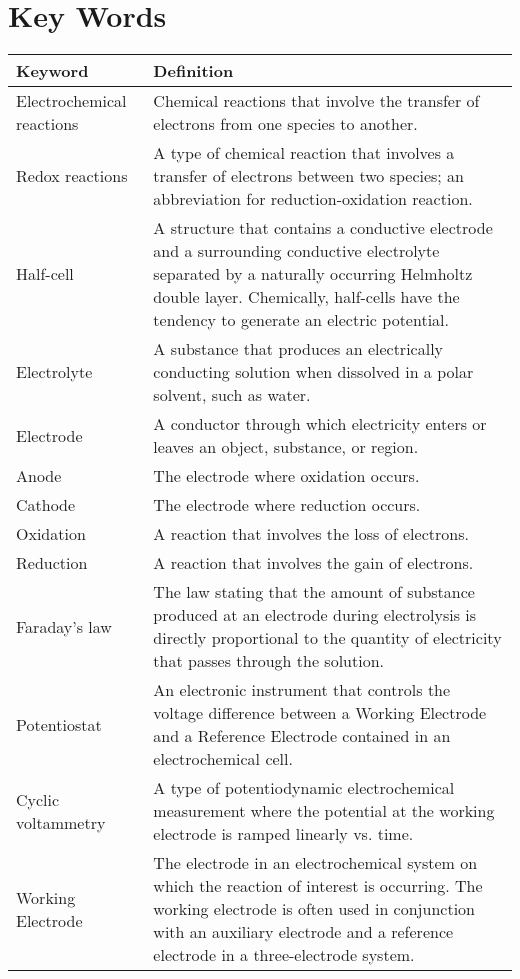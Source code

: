 \documentclass{article}
\begin{document}
\section*{\textcolor{mycolor}{Key Words}}
\begin{table}[H]
  \centering
  \begin{tabular}{|l|p{10cm}|}
  \hline
  Keyword & Definition\\
  \hline
  Electrochemical reactions & Chemical reactions that involve the transfer of electrons from one species to another.\\
  \hline
  Redox reactions & A type of chemical reaction that involves a transfer of electrons between two species; an abbreviation for reduction-oxidation reaction.\\
  \hline
  Half-cell & A structure that contains a conductive electrode and a surrounding conductive electrolyte separated by a naturally occurring Helmholtz double layer. Chemically, half-cells have the tendency to generate an electric potential.\\
  \hline
  Electrolyte & A substance that produces an electrically conducting solution when dissolved in a polar solvent, such as water.\\
  \hline
  Electrode & A conductor through which electricity enters or leaves an object, substance, or region.\\
  \hline
  Anode & The electrode where oxidation occurs.\\
  \hline
  Cathode & The electrode where reduction occurs.\\
  \hline
  Oxidation & A reaction that involves the loss of electrons.\\
  \hline
  Reduction & A reaction that involves the gain of electrons.\\
  \hline
  Faraday's law & The law stating that the amount of substance produced at an electrode during electrolysis is directly proportional to the quantity of electricity that passes through the solution.\\
  \hline
  Potentiostat & An electronic instrument that controls the voltage difference between a Working Electrode and a Reference Electrode contained in an electrochemical cell.\\
  \hline
  Cyclic voltammetry & A type of potentiodynamic electrochemical measurement where the potential at the working electrode is ramped linearly vs. time.\\
  \hline
    Working Electrode & The electrode in an electrochemical system on which the reaction of interest is occurring. The working electrode is often used in conjunction with an auxiliary electrode and a reference electrode in a three-electrode system.\\

\end{tabular}
\end{table}
\end{document}
